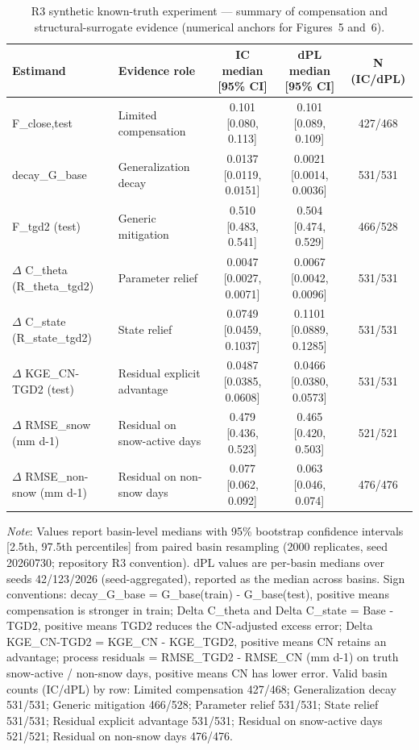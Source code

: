 \begin{table}[t]
\centering
\caption{R3 synthetic known-truth experiment --- summary of compensation and structural-surrogate evidence (numerical anchors for Figures~5 and~6).}
\label{tab:table5_r3_summary}
\begin{threeparttable}
\begin{tabular}{llccc}
\toprule
Estimand & Evidence role & IC median [95\% CI] & dPL median [95\% CI] & N (IC/dPL) \\
\midrule
F\_close,test & Limited compensation & 0.101 [0.080, 0.113] & 0.101 [0.089, 0.109] & 427/468 \\
decay\_G\_base & Generalization decay & 0.0137 [0.0119, 0.0151] & 0.0021 [0.0014, 0.0036] & 531/531 \\
F\_tgd2 (test) & Generic mitigation & 0.510 [0.483, 0.541] & 0.504 [0.474, 0.529] & 466/528 \\
$\Delta$ C\_theta (R\_theta\_tgd2) & Parameter relief & 0.0047 [0.0027, 0.0071] & 0.0067 [0.0042, 0.0096] & 531/531 \\
$\Delta$ C\_state (R\_state\_tgd2) & State relief & 0.0749 [0.0459, 0.1037] & 0.1101 [0.0889, 0.1285] & 531/531 \\
$\Delta$ KGE\_CN-TGD2 (test) & Residual explicit advantage & 0.0487 [0.0385, 0.0608] & 0.0466 [0.0380, 0.0573] & 531/531 \\
$\Delta$ RMSE\_snow (mm d-1) & Residual on snow-active days & 0.479 [0.436, 0.523] & 0.465 [0.420, 0.503] & 521/521 \\
$\Delta$ RMSE\_non-snow (mm d-1) & Residual on non-snow days & 0.077 [0.062, 0.092] & 0.063 [0.046, 0.074] & 476/476 \\
\bottomrule
\end{tabular}
\begin{tablenotes}[flushleft]
\small
\item \textit{Note}: Values report basin-level medians with 95\% bootstrap confidence intervals [2.5th, 97.5th percentiles] from paired basin resampling (2000 replicates, seed 20260730; repository R3 convention). dPL values are per-basin medians over seeds 42/123/2026 (seed-aggregated), reported as the median across basins. Sign conventions: decay\_G\_base = G\_base(train) - G\_base(test), positive means compensation is stronger in train; Delta C\_theta and Delta C\_state = Base - TGD2, positive means TGD2 reduces the CN-adjusted excess error; Delta KGE\_CN-TGD2 = KGE\_CN - KGE\_TGD2, positive means CN retains an advantage; process residuals = RMSE\_TGD2 - RMSE\_CN (mm d-1) on truth snow-active / non-snow days, positive means CN has lower error. Valid basin counts (IC/dPL) by row: Limited compensation 427/468; Generalization decay 531/531; Generic mitigation 466/528; Parameter relief 531/531; State relief 531/531; Residual explicit advantage 531/531; Residual on snow-active days 521/521; Residual on non-snow days 476/476.
\end{tablenotes}
\end{threeparttable}
\end{table}
